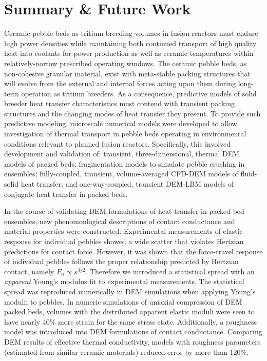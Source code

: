 \chapter{Summary \& Future Work}\label{sec:summary}
Ceramic pebble beds as tritium breeding volumes in fusion reactors must endure high power densities while maintaining both continued transport of high quality heat into coolants for power production as well as ceramic temperatures within relatively-norrow prescribed operating windows. The ceramic pebble beds, as non-cohesive granular material, exist with meta-stable packing structures that will evolve from the external and internal forces acting upon them during long-term operation as tritium breeders. As a consequence, predictive models of solid breeder heat transfer characteristics must contend with transient packing structures and the changing modes of heat transfer they present. To provide such predictive modeling, microscale numerical models were developed to allow investigation of thermal transport in pebble beds operating in environmental conditions relevant to planned fusion reactors. Specifically, this involved development and validation of: transient, three-dimensional, thermal DEM models of packed beds; fragmentation models to simulate pebble crushing in ensembles; fully-coupled, transient, volume-averaged CFD-DEM models of fluid-solid heat transfer; and one-way-coupled, transient DEM-LBM models of conjugate heat transfer in packed beds. %

In the course of validating DEM-formulations of heat transfer in packed bed ensembles, new phenomonlogical descriptions of contact conductance and material properties were constructed. Experimental measurements of elastic response for individual pebbles showed a wide scatter that violates Hertzian predictions for contact force. However, it was shown that the force-travel response of individual pebbles follows the proper relationship predicted by Hertzian contact, namely $F_n \propto s^{3/2}$. Therefore we introduced a statistical spread with an \textit{apparent} Young's modulus fit to experimental measurements. The statistical spread was reproduced numerically in DEM simulations when applying Young's modulii to pebbles. In numeric simulations of uniaxial compression of DEM packed beds, volumes with the distributed apparent elastic moduli were seen to have nearly 40\% more strain for the same stress state. Additionally, a roughness model was introduced into DEM formulations of contact conductance. Comparing DEM results of effective thermal conductivity, models with roughness parameters (estimated from similar ceramic materials) reduced error by more than 120\%. 

